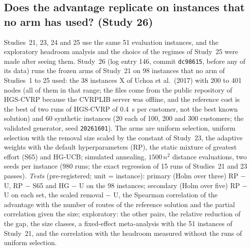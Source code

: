 \subsection{Does the advantage replicate on instances that no arm has used? (Study 26)}\label{sec:s26design}
Studies~21, 23, 24 and 25 use the same 51 evaluation instances, and the exploratory headroom analysis and the choice of the regimes of Study~25 were made after seeing them. Study~26 (log entry 146, commit \texttt{dc98615}, before any of its data) runs the frozen arms of Study~21 on 98 instances that no arm of Studies~1 to 25 used: the 38 instances X of Uchoa et al.\ (2017) with 200 to 401 nodes (all of them in that range; the files come from the public repository of HGS-CVRP because the CVRPLIB server was offline, and the reference cost is the best of two runs of HGS-CVRP of 0.4~s per customer, not the best known solution) and 60 synthetic instances (20 each of 100, 200 and 300 customers; the validated generator, seed \texttt{20261601}). The arms are uniform selection, uniform selection with the removal size scaled by the constant of Study~23, the adaptive weights with the default hyperparameters (RP), the static mixture of greatest effort (S65) and HG-UCB; simulated annealing, $1500\,n^2$ distance evaluations, two seeds per instance (980 runs; the exact regression of 15 runs of Studies~21 and 23 passes). \emph{Tests} (pre-registered; unit = instance): primary (Holm over three) RP $-$ U, RP $-$ S65 and HG $-$ U on the 98 instances; secondary (Holm over five) RP $-$ U on each set, the scaled removal $-$ U, the Spearman correlation of the advantage with the number of routes of the reference solution and the partial correlation given the size; exploratory: the other pairs, the relative reduction of the gap, the size classes, a fixed-effect meta-analysis with the 51 instances of Study~21, and the correlation with the headroom measured without the runs of uniform selection.

